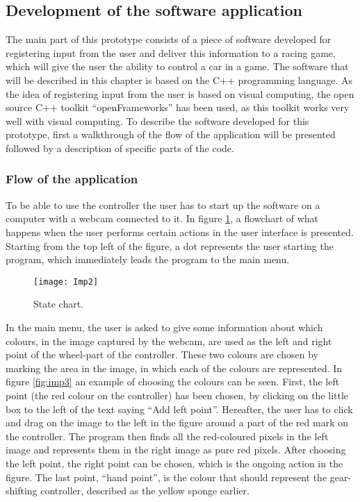 \subsection{Development of the software application}
The main part of this prototype consists of a piece of software developed for registering input from the user and deliver this information to a racing game, which will give the user the ability to control a car in a game. 
The software that will be described in this chapter is based on the C++ programming language. 
As the idea of registering input from the user is based on visual computing, the open source C++ toolkit “openFrameworks” has been used, as this toolkit works very well with visual computing.
To describe the software developed for this prototype, first a walkthrough of the flow of the application will be presented followed by a description of specific parts of the code.

\subsubsection{Flow of the application}
To be able to use the controller the user has to start up the software on a computer with a webcam connected to it. 
In figure \ref{fig:imp2}, a flowchart of what happens when the user performs certain actions in the user interface is presented. 
Starting from the top left of the figure, a dot represents the user starting the program, which immediately leads the program to the main menu.
\bigskip

\begin{figure}[!htbp]
\centering
\texttt{[image: Imp2]}
\caption{State chart.} 
\label{fig:imp2}
\end{figure}

In the main menu, the user is asked to give some information about which colours, in the image captured by the webcam, are used as the left and right point of the wheel-part of the controller. 
These two colours are chosen by marking the area in the image, in which each of the colours are represented. 
In figure \ref{fig:imp3} an example of choosing the colours can be seen. 
First, the left point (the red colour on the controller) has been chosen, by clicking on the little box to the left of the text saying “Add left point”.
Hereafter, the user has to click and drag on the image to the left in the figure around a part of the red mark on the controller. 
The program then finds all the red-coloured pixels in the left image and represents them in the right image as pure red pixels. 
After choosing the left point, the right point can be chosen, which is the ongoing action in the figure. 
The last point, “hand point”, is the colour that should represent the gear-shifting controller, described as the yellow sponge earlier.
\bigskip

